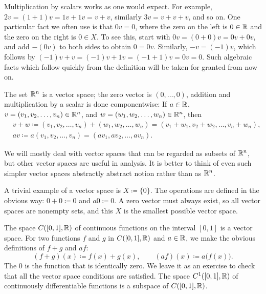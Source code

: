 Multiplication by scalars works as one would expect.
For example, $2v = (1+1)v = 1v + 1v = v+v$, similarly $3v = v+v+v$, and
so on.  
One particular fact we often use is that $0 v = 0$, where
the zero on the left is $0 \in {\mathbb{R}}$ and the zero on the right is $0 \in X$.
To see this, start with
$0v = (0+0)v = 0v + 0v$, and add $-(0v)$ to both sides
to obtain $0 = 0v$.  Similarly, $-v = (-1)v$, which follows by
$(-1)v+v = (-1)v + 1v = (-1+1)v = 0v = 0$.
Such algebraic facts which follow quickly from the definition will be taken
for granted from now on.

\begin{example}
The set ${\mathbb{R}}^n$ is a vector space;
the zero vector is $(0,\ldots,0)$, addition
and multiplication by a scalar is done componentwise:
If $a \in {\mathbb{R}}$, $v = (v_1,v_2,\ldots,v_n) \in {\mathbb{R}}^n$, and $w =
(w_1,w_2,\ldots,w_n) \in {\mathbb{R}}^n$, then
\begin{align*}
& v+w \coloneqq
(v_1,v_2,\ldots,v_n) +
(w_1,w_2,\ldots,w_n) 
=
(v_1+w_1,v_2+w_2,\ldots,v_n+w_n) , \\
& a v \coloneqq
a (v_1,v_2,\ldots,v_n) =
(a v_1, a v_2,\ldots, a v_n) .
\end{align*}
\end{example}

We will mostly deal with  vector spaces that can
be regarded as subsets of ${\mathbb{R}}^n$, but other vector spaces are useful in
analysis.
It is better to think of even such simpler
vector spaces abstractly abstract notion rather than as ${\mathbb{R}}^n$.

\begin{example}
A trivial example of a vector space is
$X \coloneqq \{ 0 \}$.  The operations are defined in the obvious way:
$0 + 0 \coloneqq 0$ and $a0 \coloneqq 0$.  A zero vector must always exist,
so all vector spaces are nonempty sets, and this $X$ is the smallest
possible vector space.
\end{example}

\begin{example}
The space $C([0,1],{\mathbb{R}})$ of continuous functions on the interval $[0,1]$
is a vector space.  For two functions $f$ and $g$ in $C([0,1],{\mathbb{R}})$ and
$a \in {\mathbb{R}}$, we make the obvious definitions of $f+g$ and $af$:
\begin{equation*}
(f+g)(x) \coloneqq f(x) + g(x), \qquad (af) (x) \coloneqq a\bigl(f(x)\bigr) .
\end{equation*}
The 0 is the function that is identically zero.  We leave it as an exercise
to check that all the vector space conditions are satisfied.
The space $C^1([0,1],{\mathbb{R}})$ of continuously differentiable functions is
a subspace of $C([0,1],{\mathbb{R}})$.
\end{example}

